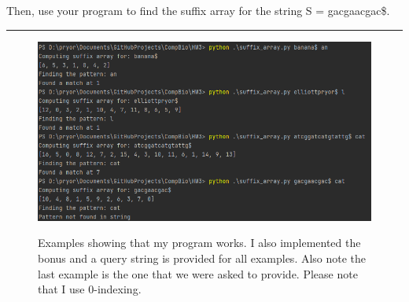 \documentclass[11pt]{article}
\begin{document}
Then, use your program to find the suffix array for the string S = gacgaacgac\$.
\hrule

\begin{figure}[h] 
    \centering
    \includegraphics[width=0.9 \linewidth]{examples.png}
    \label{fig:examples}
    \caption{Examples showing that my program works. I also implemented the bonus and a query
    string is provided for all examples.
    Also note the last example is the one that we were asked to provide.
    Please note that I use 0-indexing.}
\end{figure}

\lstset{style=mystyle}

\end{document}
